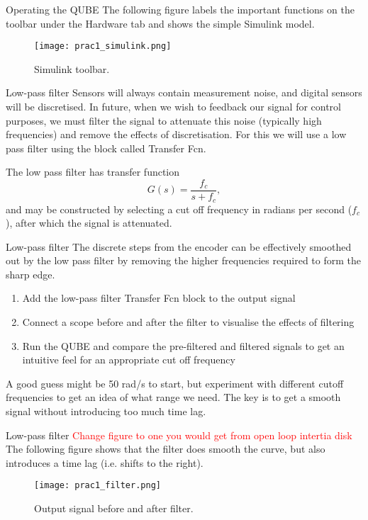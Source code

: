\documentclass[9pt]{beamer-control}
\begin{document}
\begin{frame}{Operating the QUBE}
	The following figure labels the important functions on the toolbar under the Hardware tab and shows the simple Simulink model.
\begin{figure}
	\centering
	\texttt{[image: prac1\_simulink.png]}
	\caption{Simulink toolbar.}
\end{figure}
\end{frame}



\begin{frame}{Low-pass filter}
Sensors will always contain measurement noise, and digital sensors will be discretised. In future, when we wish to feedback our signal for control purposes, we must filter the signal to attenuate this noise (typically high frequencies) and remove the effects of discretisation. For this we will use a low pass filter using the block called Transfer Fcn. 

The low pass filter has transfer function
\[
G(s) = \frac{f_c}{s+f_c},
\]
and may be constructed by selecting a cut off frequency in radians per second ($f_c$), after which the signal is attenuated.

\end{frame}


\begin{frame}{Low-pass filter}
The discrete steps from the encoder can be effectively smoothed out by the low pass filter by removing the higher frequencies required to form the sharp edge. 
\begin{enumerate}
	\item Add the low-pass filter Transfer Fcn block to the output signal
	\item Connect a scope before and after the filter to visualise the effects of filtering
	\item Run the QUBE and compare the pre-filtered and filtered signals to get an intuitive feel for an appropriate cut off frequency
\end{enumerate}

 A good guess might be 50 rad/s to start, but experiment with different cutoff frequencies to get an idea of what range we need. The key is to get a smooth signal without introducing too much time lag. 
\end{frame}

\begin{frame}{Low-pass filter}
\textcolor{red}{Change figure to one you would get from open loop intertia disk}
The following figure shows that the filter does smooth the curve, but also introduces a time lag (i.e. shifts to the right).
\begin{figure}
	\centering
	\texttt{[image: prac1\_filter.png]}
	\caption{Output signal before and after filter.}
\end{figure}
\end{frame}
\end{document}

